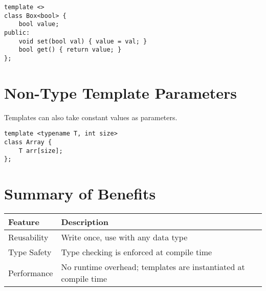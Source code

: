 \documentclass{article}
\begin{document}
\begin{lstlisting}[style=cppstyle]
template <>
class Box<bool> {
    bool value;
public:
    void set(bool val) { value = val; }
    bool get() { return value; }
};
\end{lstlisting}

\section{Non-Type Template Parameters}

Templates can also take constant values as parameters.

\begin{lstlisting}[style=cppstyle]
template <typename T, int size>
class Array {
    T arr[size];
};
\end{lstlisting}

\section{Summary of Benefits}

\begin{tabular}{|l|p{10cm}|}
\hline
\textbf{Feature} & \textbf{Description} \\
\hline
Reusability & Write once, use with any data type \\
\hline
Type Safety & Type checking is enforced at compile time \\
\hline
Performance & No runtime overhead; templates are instantiated at compile time \\
\hline
\end{tabular}
\end{document}
